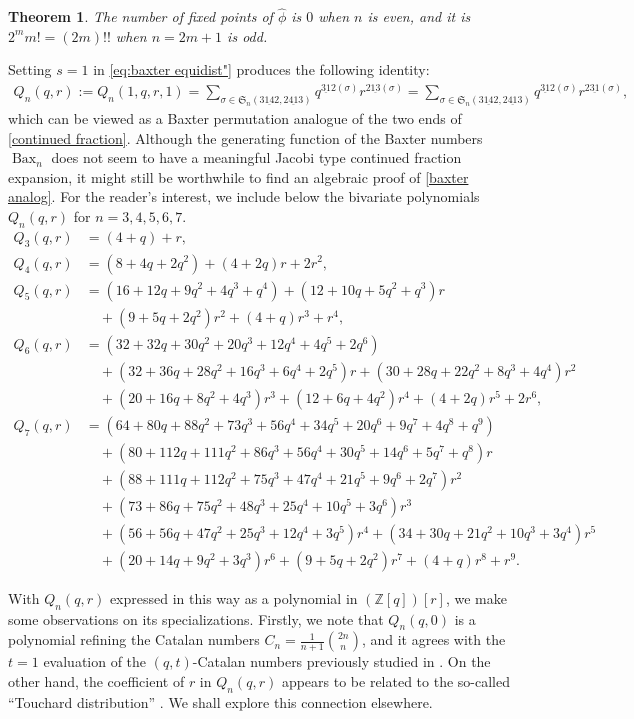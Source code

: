 \documentclass[12pt,reqno]{amsart}
\numberwithin{equation}{section}
\theoremstyle{plain}
\newtheorem{theorem}{Theorem}[section]
\theoremstyle{definition}
\newcommand{\Z}{\mathbb{Z}}
\def\Sym{\mathfrak{S}}
\def\rasc{\mathrm{2\underline{13}}}
\def\rdes{\mathrm{2\underline{31}}}
\def\ldes{\mathrm{\underline{31}2}}
\def\baxter{\mathrm{3\underline{14}2,2\underline{41}3}}
\def\Bax{\operatorname{Bax}}
\begin{document}
\begin{theorem}
The number of fixed points of $\widehat\phi$ is $0$ when $n$ is even, and it is $2^m m!=(2m)!!$ when $n=2m+1$ is odd.
\end{theorem}

Setting $s=1$ in \eqref{eq:baxter equidist"} produces the following identity:
\begin{align}\label{baxter analog}
Q_n(q,r):=Q_n(1,q,r,1)=\sum_{\sigma\in\Sym_n(\baxter)}q^{\ldes(\sigma)}r^{\rasc(\sigma)} = \sum_{\sigma\in\Sym_n(\baxter)}q^{\ldes(\sigma)}r^{\rdes(\sigma)},
\end{align}
which can be viewed as a Baxter permutation analogue of the two ends of \eqref{continued fraction}. Although the generating function of the Baxter numbers $\Bax_n$ does not seem to have a meaningful Jacobi type continued fraction expansion, it might still be worthwhile to find an algebraic proof of \eqref{baxter analog}. For the reader's interest, we include below the bivariate polynomials $Q_n(q,r)$ for $n=3,4,5,6,7$.
\begin{align*}
    Q_3(q,r) &= (4+q) + r,\\
    Q_4(q,r) &= (8+4q+2q^2) + (4+2q)r + 2r^2,\\
    Q_5(q,r) &= (16+12q+9q^2+4q^3+q^4) + (12+10q+5q^2+q^3)r\\
             &\quad + (9+5q+2q^2)r^2 + (4+q)r^3 + r^4,\\
    Q_6(q,r) &= (32+32q+30q^2+20q^3+12q^4+4q^5+2q^6)\\
             &\quad + (32+36q+28q^2+16q^3+6q^4+2q^5)r + (30+28q+22q^2+8q^3+4q^4)r^2 \\
             &\quad + (20+16q+8q^2+4q^3)r^3 + (12+6q+4q^2)r^4+(4+2q)r^5+2r^6,\\
    Q_7(q,r) &= (64+80q+88q^2+73q^3+56q^4+34q^5+20q^6+9q^7+4q^8+q^9)\\ 
             &\quad + (80+112q+111q^2+86q^3+56q^4+30q^5+14q^6+5q^7+q^8)r\\
             &\quad + (88+111q+112q^2+75q^3+47q^4+21q^5+9q^6+2q^7)r^2\\
             &\quad + (73+86q+75q^2+48q^3+25q^4+10q^5+3q^6)r^3\\
             &\quad + (56+56q+47q^2+25q^3+12q^4+3q^5)r^4 + (34+30q+21q^2+10q^3+3q^4)r^5\\
             &\quad + (20+14q+9q^2+3q^3)r^6 + (9+5q+2q^2)r^7+(4+q)r^8+r^9.
\end{align*}

With $Q_n(q,r)$ expressed in this way as a polynomial in $(\Z[q])[r]$, we make some observations on its specializations. Firstly, we note that $Q_n(q,0)$ is a polynomial refining the Catalan numbers $C_n=\frac{1}{n+1}\binom{2n}{n}$, and it agrees with the $t=1$ evaluation of the $(q,t)$-Catalan numbers previously studied in \cite[Theorem 1.1 choice \# 7]{FTHZ19}. On the other hand, the coefficient of $r$ in $Q_n(q,r)$ appears to be related to the so-called ``Touchard distribution'' \cite[A091894]{OEIS}. We shall explore this connection elsewhere.
\end{document}
